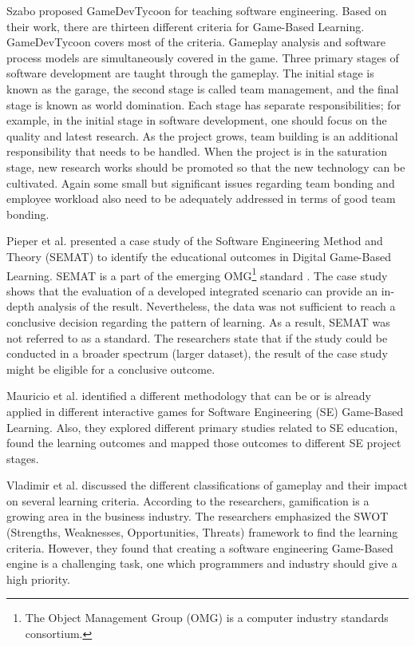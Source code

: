 Szabo \cite{gamedev} proposed GameDevTycoon for teaching software engineering. Based on their work, there are thirteen different criteria for Game-Based Learning. GameDevTycoon covers most of the criteria. Gameplay analysis and software process models are simultaneously covered in the game. Three primary stages of software development are taught through the gameplay. The initial stage is known as the garage, the second stage is called team management, and the final stage is known as world domination. Each stage has separate responsibilities; for example, in the initial stage in software development, one should focus on the quality and latest research. As the project grows, team building is an additional responsibility that needs to be handled. When the project is in the saturation stage, new research works should be promoted so that the new technology can be cultivated. Again some small but significant issues regarding team bonding and employee workload also need to be adequately addressed in terms of good team bonding.

Pieper et al. \cite{SEMAT} presented a case study of the Software Engineering Method and Theory (SEMAT) to identify the educational outcomes in Digital Game-Based Learning. SEMAT is a part of the emerging OMG\footnote{The Object Management Group (OMG) is a computer industry standards consortium.} standard \cite{kernerl}. The case study shows that the evaluation of a developed integrated scenario can provide an in-depth analysis of the result. Nevertheless, the data was not sufficient to reach a conclusive decision regarding the pattern of learning. As a result, SEMAT was not referred to as a standard. The researchers state that if the study could be conducted in a broader spectrum (larger dataset), the result of the case study might be eligible for a conclusive outcome.

Mauricio et al. \cite{gamesforlearning} identified a different methodology that can be or is already applied in different interactive games for Software Engineering (SE) Game-Based Learning. Also, they explored different primary studies related to SE education, found the learning outcomes and mapped those outcomes to different SE project stages. 

Vladimir et al. \cite{gamification} discussed the different classifications of gameplay and their impact on several learning criteria. According to the researchers, gamification is a growing area in the business industry. The researchers emphasized the SWOT (Strengths, Weaknesses, Opportunities, Threats) framework \cite{swot} to find the learning criteria. However, they found that creating a software engineering Game-Based engine is a challenging task, one which programmers and industry should give a high priority. 

